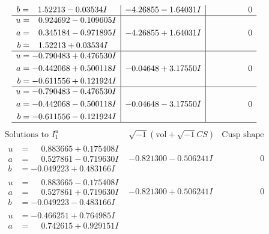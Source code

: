 \documentclass[1p]{elsarticle_modified}
\theoremstyle{definition}
\newcommand{\I}{\sqrt{-1}}
\begin{document}
$$\begin{array}{c|c|c}
\begin{aligned}
b &= \phantom{-}1.52213 - 0.03534 I\end{aligned}
 & -4.26855 - 1.64031 I & \phantom{-0.000000 } 0 \\ \hline\begin{aligned}
u &= \phantom{-}0.924692 - 0.109605 I \\
a &= \phantom{-}0.345184 - 0.971895 I \\
b &= \phantom{-}1.52213 + 0.03534 I\end{aligned}
 & -4.26855 + 1.64031 I & \phantom{-0.000000 } 0 \\ \hline\begin{aligned}
u &= -0.790483 + 0.476530 I \\
a &= -0.442068 + 0.500118 I \\
b &= -0.611556 + 0.121924 I\end{aligned}
 & -0.04648 + 3.17550 I & \phantom{-0.000000 } 0 \\ \hline\begin{aligned}
u &= -0.790483 - 0.476530 I \\
a &= -0.442068 - 0.500118 I \\
b &= -0.611556 - 0.121924 I\end{aligned}
 & -0.04648 - 3.17550 I & \phantom{-0.000000 } 0\\
 \hline 
 \end{array}$$\newpage$$\begin{array}{c|c|c}  
\text{Solutions to }I^u_{1}& \I (\text{vol} + \sqrt{-1}CS) & \text{Cusp shape}\\
 \hline 
\begin{aligned}
u &= \phantom{-}0.883665 + 0.175408 I \\
a &= \phantom{-}0.527861 - 0.719630 I \\
b &= -0.049223 + 0.483166 I\end{aligned}
 & -0.821300 - 0.506241 I & \phantom{-0.000000 } 0 \\ \hline\begin{aligned}
u &= \phantom{-}0.883665 - 0.175408 I \\
a &= \phantom{-}0.527861 + 0.719630 I \\
b &= -0.049223 - 0.483166 I\end{aligned}
 & -0.821300 + 0.506241 I & \phantom{-0.000000 } 0 \\ \hline\begin{aligned}
u &= -0.466251 + 0.764985 I \\
a &= \phantom{-}0.742615 + 0.929151 I \\

\end{aligned}
\end{array}$$
\end{document}
